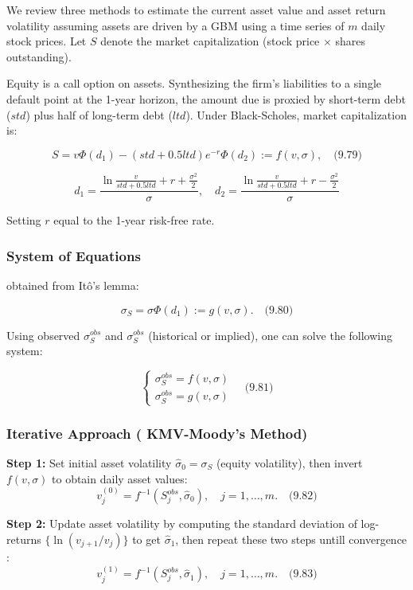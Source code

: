 \documentclass[12pt,a4paper]{article}
\begin{document}
We review three methods to estimate the current asset value and asset return volatility assuming assets are driven by a GBM using a time series of $m$ daily stock prices. Let $S$ denote the market capitalization (stock price $\times$ shares outstanding).

Equity is a call option on assets. Synthesizing the firm's liabilities to a single default point at the 1-year horizon, the amount due is proxied by short-term debt ($std$) plus half of long-term debt ($ltd$). Under Black-Scholes, market capitalization is:

$$S = v\Phi(d_1) - (std + 0.5ltd)e^{-r}\Phi(d_2) := f(v, \sigma), \quad \text{(9.79)}$$


$$d_1 = \frac{\ln\frac{v}{std + 0.5ltd} + r + \frac{\sigma^2}{2}}{\sigma}, \quad d_2 = \frac{\ln\frac{v}{std + 0.5ltd} + r - \frac{\sigma^2}{2}}{\sigma}$$

Setting $r$ equal to the 1-year risk-free rate.

\subsubsection{ System of Equations }
obtained from Itô's lemma: 

$$\sigma_S = \sigma \Phi(d_1) := g(v, \sigma). \quad \text{(9.80)}$$

Using observed $\sigma_S^{obs}$ and $\sigma_S^{obs}$ (historical or implied), one can solve the following system:

$$\begin{cases}
\sigma_S^{obs} = f(v, \sigma) \\
\sigma_S^{obs} = g(v, \sigma)
\end{cases} \quad \text{(9.81)}$$

\subsubsection{Iterative Approach ( KMV-Moody's Method) }

\textbf{Step 1:} Set initial asset volatility $\hat{\sigma}_0 = \sigma_S$ (equity volatility), then invert $f(v, \sigma)$ to obtain daily asset values:
$$v_j^{(0)} = f^{-1}(S_j^{obs}, \hat{\sigma}_0), \quad j = 1, \ldots, m. \quad \text{(9.82)}$$

\textbf{Step 2:} Update asset volatility by computing the standard deviation of log-returns $\{\ln(v_{j+1}/v_j)\}$ to get $\hat{\sigma}_1$, then repeat these two steps untill convergence :
$$v_j^{(1)} = f^{-1}(S_j^{obs}, \hat{\sigma}_1), \quad j = 1, \ldots, m. \quad \text{(9.83)}$$
\end{document}
